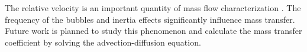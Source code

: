 \documentclass[preprint,12pt]{elsarticle}
\begin{document}
The relative velocity is an important quantity of mass flow characterization
\cite{kreutzer-taylor,yue-mass}. The frequency of the bubbles \cite{kreutzer-taylor} and 
inertia effects \citet{heil-bretherton} significantly influence  mass transfer. 
Future work is planned to study this phenomenon and calculate the mass transfer coefficient by
solving the advection-diffusion equation.

\end{document}
